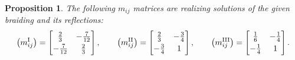 \documentclass[pdftex]{sigma}%
\numberwithin{equation}{section}
\newtheorem{prop}[teo]{Proposition}
\begin{document}
\begin{prop}
The following $m_{ij}$ matrices are realizing solutions of the given braiding and its reflections:
\[\big(m_{ij}^{\mathrm{I}}\big)= \begin{bmatrix}
 \frac{2}{3} & -\frac{7}{12}\vspace{1mm}\\
 -\frac{7}{12} & \frac{2}{3}
\end{bmatrix}, \qquad
\big(m_{ij}^{\mathrm{II}}\big)= \begin{bmatrix}
 \frac{2}{3} & -\frac{3}{4}\vspace{1mm}\\
 -\frac{3}{4} & 1
\end{bmatrix}, \qquad
\big(m_{ij}^{\mathrm{III}}\big)= \begin{bmatrix}
 \frac{1}{6} & -\frac{1}{4}\vspace{1mm}\\
 -\frac{1}{4} & 1
\end{bmatrix}. \]
\end{prop}
\end{document}
